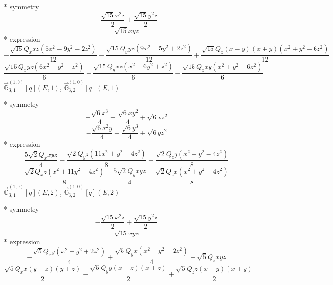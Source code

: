 \documentclass[fleqn,8pt]{jsarticle}
\begin{document}
\noindent\quad ** symmetry
\begin{dmath*}
- \frac{\sqrt{15} x^{2} z}{2} + \frac{\sqrt{15} y^{2} z}{2}
\end{dmath*}
\begin{dmath*}
\sqrt{15} x y z
\end{dmath*}
\noindent\quad ** expression
\begin{dmath*}
- \frac{\sqrt{15} Q_{x} x z \left(5 x^{2} - 9 y^{2} - 2 z^{2}\right)}{12} - \frac{\sqrt{15} Q_{y} y z \left(9 x^{2} - 5 y^{2} + 2 z^{2}\right)}{12} + \frac{\sqrt{15} Q_{z} \left(x - y\right) \left(x + y\right) \left(x^{2} + y^{2} - 6 z^{2}\right)}{12}
\end{dmath*}
\begin{dmath*}
\frac{\sqrt{15} Q_{x} y z \left(6 x^{2} - y^{2} - z^{2}\right)}{6} - \frac{\sqrt{15} Q_{y} x z \left(x^{2} - 6 y^{2} + z^{2}\right)}{6} - \frac{\sqrt{15} Q_{z} x y \left(x^{2} + y^{2} - 6 z^{2}\right)}{6}
\end{dmath*}
\noindent\quad $\vec{\mathbb{G}}_{3,1}^{(1,0)}[q](E,1)$, $\vec{\mathbb{G}}_{3,2}^{(1,0)}[q](E,1)$

\noindent\quad ** symmetry
\begin{dmath*}
- \frac{\sqrt{6} x^{3}}{4} - \frac{\sqrt{6} x y^{2}}{4} + \sqrt{6} x z^{2}
\end{dmath*}
\begin{dmath*}
- \frac{\sqrt{6} x^{2} y}{4} - \frac{\sqrt{6} y^{3}}{4} + \sqrt{6} y z^{2}
\end{dmath*}
\noindent\quad ** expression
\begin{dmath*}
\frac{5 \sqrt{2} Q_{x} x y z}{4} - \frac{\sqrt{2} Q_{y} z \left(11 x^{2} + y^{2} - 4 z^{2}\right)}{8} + \frac{\sqrt{2} Q_{z} y \left(x^{2} + y^{2} - 4 z^{2}\right)}{8}
\end{dmath*}
\begin{dmath*}
\frac{\sqrt{2} Q_{x} z \left(x^{2} + 11 y^{2} - 4 z^{2}\right)}{8} - \frac{5 \sqrt{2} Q_{y} x y z}{4} - \frac{\sqrt{2} Q_{z} x \left(x^{2} + y^{2} - 4 z^{2}\right)}{8}
\end{dmath*}
\noindent\quad $\vec{\mathbb{G}}_{3,1}^{(1,0)}[q](E,2)$, $\vec{\mathbb{G}}_{3,2}^{(1,0)}[q](E,2)$

\noindent\quad ** symmetry
\begin{dmath*}
- \frac{\sqrt{15} x^{2} z}{2} + \frac{\sqrt{15} y^{2} z}{2}
\end{dmath*}
\begin{dmath*}
\sqrt{15} x y z
\end{dmath*}
\noindent\quad ** expression
\begin{dmath*}
- \frac{\sqrt{5} Q_{x} y \left(x^{2} - y^{2} + 2 z^{2}\right)}{4} + \frac{\sqrt{5} Q_{y} x \left(x^{2} - y^{2} - 2 z^{2}\right)}{4} + \sqrt{5} Q_{z} x y z
\end{dmath*}
\begin{dmath*}
\frac{\sqrt{5} Q_{x} x \left(y - z\right) \left(y + z\right)}{2} - \frac{\sqrt{5} Q_{y} y \left(x - z\right) \left(x + z\right)}{2} + \frac{\sqrt{5} Q_{z} z \left(x - y\right) \left(x + y\right)}{2}
\end{dmath*}
\end{document}
